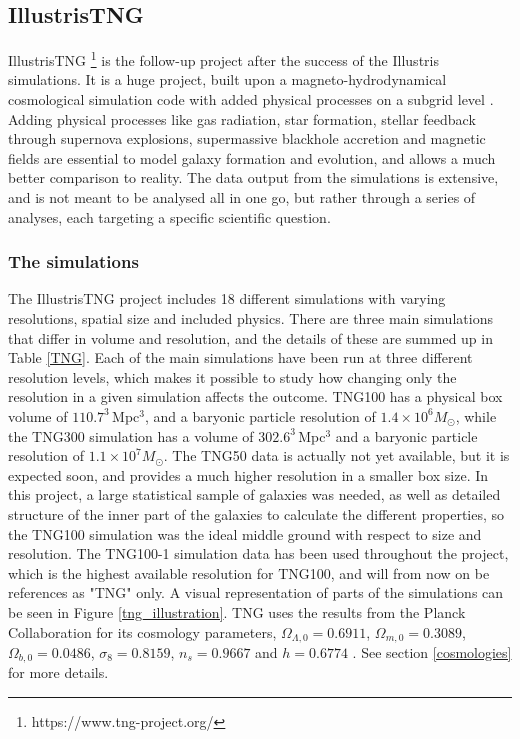 \subsection{IllustrisTNG}
IllustrisTNG \footnote{https://www.tng-project.org/} is the follow-up project after the success of the Illustris simulations. It is a huge project, built upon a magneto-hydrodynamical cosmological simulation code with added physical processes on a subgrid level \parencite{Weinberger2016}. Adding physical processes like gas radiation, star formation, stellar feedback through supernova explosions, supermassive blackhole accretion and magnetic fields are essential to model galaxy formation and evolution, and allows a much better comparison to reality. The data output from the simulations is extensive, and is not meant to be analysed all in one go, but rather through a series of analyses, each targeting a specific scientific question. 


\subsubsection{The simulations}
The IllustrisTNG project includes 18 different simulations with varying resolutions, spatial size and included physics. There are three main simulations that differ in volume and resolution, and the details of these are summed up in Table \ref{TNG}. Each of the main simulations have been run at three different resolution levels, which makes it possible to study how changing only the resolution in a given simulation affects the outcome. TNG100 has a physical box volume of $110.7^3 \, $Mpc$^3$, and a baryonic particle resolution of $1.4 \times 10^6 M_{\odot}$, while the TNG300 simulation has a volume of $302.6^3 \, $Mpc$^3$ and a baryonic particle resolution of $1.1 \times 10^7 M_{\odot}$. The TNG50 data is actually not yet available, but it is expected soon, and provides a much higher resolution in a smaller box size. In this project, a large statistical sample of galaxies was needed, as well as detailed structure of the inner part of the galaxies to calculate the different properties, so the TNG100 simulation was the ideal middle ground with respect to size and resolution. The TNG100-1 simulation data has been used throughout the project, which is the highest available resolution for TNG100, and will from now on be references as "TNG" only. A visual representation of parts of the simulations can be seen in Figure \ref{tng_illustration}. TNG uses the results from the Planck Collaboration for its cosmology parameters, $\Omega_{\Lambda,0} = 0.6911$, $\Omega_{m,0}=0.3089$, $\Omega_{b,0}=0.0486$, $\sigma_8=0.8159$, $n_s=0.9667$ and $h = 0.6774$ \parencite{Planck2015}. See section \ref{cosmologies} for more details.

